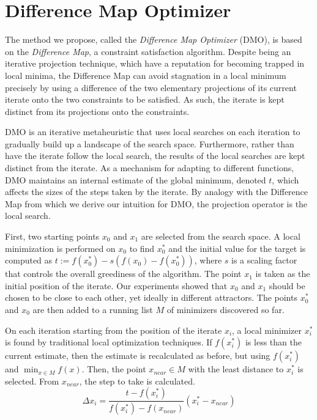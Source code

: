 \documentclass[12pt]{article}
\begin{document}
\section{Difference Map Optimizer}
    The method we propose, called the \emph{Difference Map Optimizer} (DMO), is
    based on the \emph{Difference Map}\cite{elser2007}, a constraint
    satisfaction algorithm.
    Despite being an iterative projection technique, which have a reputation
    for becoming trapped in local minima, the Difference Map can avoid
    stagnation in a local minimum precisely by using a difference of the two
    elementary projections of its current iterate onto the two constraints to
    be satisfied. As such, the iterate is kept distinct from its projections
    onto the constraints.

    DMO is an iterative metaheuristic that uses local searches on each
    iteration to gradually build up a landscape of the search space.
    Furthermore, rather than have the iterate follow the local search, the
    results of the local searches are kept distinct from the iterate.
    As a mechanism for adapting to different functions, DMO maintains an
    internal estimate of the global minimum, denoted $t$, which affects the
    sizes of the steps taken by the iterate. By analogy with the Difference Map
    from which we derive our intuition for DMO, the projection operator is the
    local search.

    First, two starting points $x_0$ and $x_1$ are selected from the search
    space.
    A local minimization is performed on $x_0$ to find $x_0^*$ and the
    initial value for the target is computed as
    $t := f(x_0^*) - s (f(x_0) - f(x_0^*))$,
    where $s$ is a scaling factor that controls the overall greediness of the
    algorithm.
    The point $x_1$ is taken as the initial position of the iterate. Our
    experiments showed that $x_0$ and $x_1$ should be chosen to be close to
    each other, yet ideally in different attractors.
    The points $x_0^*$ and $x_0$ are then added to a running list $M$ of
    minimizers discovered so far.

    On each iteration starting from the position of the iterate $x_i$, a local
    minimizer $x_i^*$ is found by traditional local optimization techniques.
    If $f(x_i^*)$ is less than the current estimate, then the estimate is
    recalculated as before, but using $f(x_i^*)$ and $\min_{x \in M} f(x)$.
    Then, the point $x_{near} \in M$ with the least distance to $x_i^*$ is
    selected.
    From $x_{near}$, the step to take is calculated.
    \begin{equation}
        \Delta x_i =
            \frac{t - f(x_i^*)}{f(x_i^*) - f(x_{near})} (x_i^* - x_{near})
        \label{eqn:dx}
    \end{equation}
\end{document}
